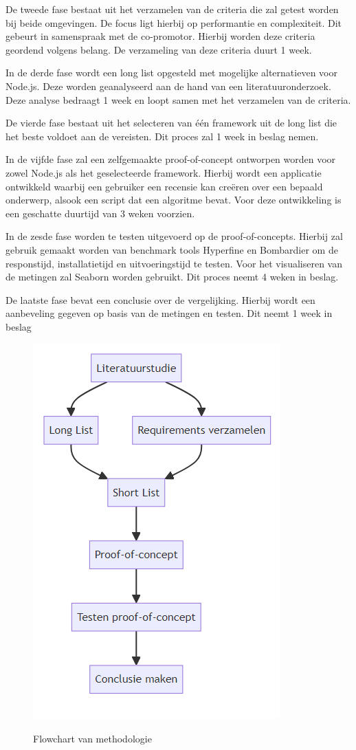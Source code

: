 De tweede fase bestaat uit het verzamelen van de criteria die zal getest worden bij beide omgevingen. 
De focus ligt hierbij op performantie en complexiteit.
Dit gebeurt in samenspraak met de co-promotor. Hierbij worden deze criteria geordend volgens belang. 
De verzameling van deze criteria duurt 1 week.

In de derde fase wordt een long list opgesteld met mogelijke alternatieven voor Node.js. 
Deze worden geanalyseerd aan de hand van een literatuuronderzoek. Deze analyse bedraagt 1 week en loopt samen met het verzamelen van de criteria.

De vierde fase bestaat uit het selecteren van één framework uit de long list die het beste voldoet aan de vereisten. 
Dit proces zal 1 week in beslag nemen.

In de vijfde fase zal een zelfgemaakte proof-of-concept ontworpen worden voor zowel Node.js als het geselecteerde framework. 
Hierbij wordt een applicatie ontwikkeld waarbij een gebruiker een recensie kan creëren over een bepaald onderwerp, 
alsook een script dat een algoritme bevat.
Voor deze ontwikkeling is een geschatte duurtijd van 3 weken voorzien.

In de zesde fase worden te testen uitgevoerd op de proof-of-concepts. 
Hierbij zal gebruik gemaakt worden van benchmark tools Hyperfine en Bombardier om de responstijd, installatietijd en uitvoeringstijd te testen.
Voor het visualiseren van de metingen zal Seaborn worden gebruikt.
Dit proces neemt 4 weken in beslag.

De laatste fase bevat een conclusie over de vergelijking. 
Hierbij wordt een aanbeveling gegeven op basis van de metingen en testen.
Dit neemt 1 week in beslag
\begin{figure}[h]
    \centering
    \includegraphics[width=.4\textwidth]{graphics/flowchart.png}
    \caption{\label{fig:flowchart}}Flowchart van methodologie
\end{figure}
